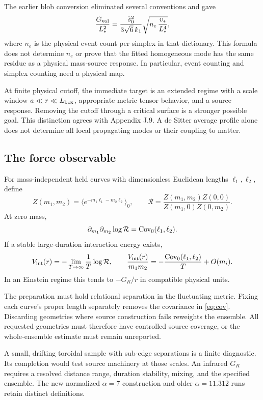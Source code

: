 The earlier blob conversion eliminated several conventions and gave
\begin{equation}
\frac{G_{\rm vol}}{L_*^2}
=\frac{\widetilde s_0^2}{3\sqrt6\,k_1}
\sqrt{n_e\,\frac{v_*}{L_*^4}},
\end{equation}
where $n_e$ is the physical event count per simplex in that dictionary. This formula does not determine $n_e$ or prove that the fitted homogeneous mode has the same residue as a physical mass-source response. In particular, event counting and simplex counting need a physical map.

At finite physical cutoff, the immediate target is an extended regime with a scale window $a\ll r\ll L_{\rm box}$, appropriate metric tensor behavior, and a source response. Removing the cutoff through a critical surface is a stronger possible goal. This distinction agrees with Appendix J.9. A de Sitter average profile alone does not determine all local propagating modes or their coupling to matter.



\subsection{The force observable}

For mass-independent held curves with dimensionless Euclidean lengths $\ell_1,\ell_2$, define
\begin{equation}
Z(m_1,m_2)=\langle e^{-m_1\ell_1-m_2\ell_2}\rangle_0,\qquad
\mathcal R=\frac{Z(m_1,m_2)Z(0,0)}{Z(m_1,0)Z(0,m_2)}.
\end{equation}
At zero mass,
\begin{equation}
\partial_{m_1}\partial_{m_2}\log\mathcal R
=\operatorname{Cov}_0(\ell_1,\ell_2).
\label{eq:cov}
\end{equation}
If a stable large-duration interaction energy exists,
\begin{equation}
V_{\rm int}(r)=-\lim_{T\to\infty}\frac1T\log\mathcal R,
\qquad
\frac{V_{\rm int}(r)}{m_1m_2}
=-\frac{\operatorname{Cov}_0(\ell_1,\ell_2)}{T}+O(m_i).
\end{equation}
In an Einstein regime this tends to $-G_R/r$ in compatible physical units.

The preparation must hold relational separation in the fluctuating metric. Fixing each curve's proper length separately removes the covariance in \eqref{eq:cov}. Discarding geometries where source construction fails reweights the ensemble. All requested geometries must therefore have controlled source coverage, or the whole-ensemble estimate must remain unreported.

A small, drifting toroidal sample with sub-edge separations is a finite diagnostic. Its completion would test source machinery at those scales. An infrared $G_R$ requires a resolved distance range, duration stability, mixing, and the specified ensemble. The new normalized $\alpha=7$ construction and older $\alpha=11.312$ runs retain distinct definitions.
